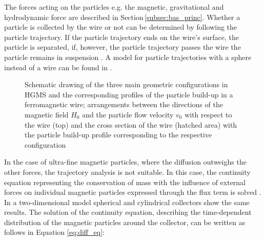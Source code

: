 The forces acting on the particles e.g. the magnetic, gravitational and hydrodynamic force are described in Section\,\ref{subsec:bas_princ}. Whether a particle is collected by the wire or not can be determined by following the particle trajectory. If the particle trajectory ends on the wire's surface, the particle is separated, if, however, the particle trajectory passes the wire the particle remains in suspension \cite{FranzrebHabil}. A model for particle trajectories with a sphere instead of a wire can be found in \cite{friedlaender1981particle,moyer1986filtration}.

\begin{figure}
\centering

\caption[Geometric configurations in HGMS and particle build-up]{Schematic drawing of the three main geometric configurations in HGMS and the corresponding profiles of the particle build-up in a ferromagnetic wire; arrangements between the directions of the magnetic field $H_{0}$ and the particle flow velocity $v_{0}$ with respect to the wire (top) and the cross section of the wire (hatched area) with the particle build-up profile corresponding to the respective configuration \cite{svoboda2004magnetic}
\label{fig:hgms_config}
}
\end{figure}

In the case of ultra-fine magnetic particles, where the diffusion outweighs the other forces, the trajectory analysis is not suitable. In this case, the continuity equation representing the conservation of mass with the influence of external forces on individual magnetic particles expressed through the flux term is solved \cite{choomphon2017simulation}. In a two-dimensional model spherical and cylindrical collectors show the same results. The solution of the continuity equation, describing the time-dependent distribution of the magnetic particles around the collector, can be written as follows in Equation \ref{eq:diff_eq}:     

